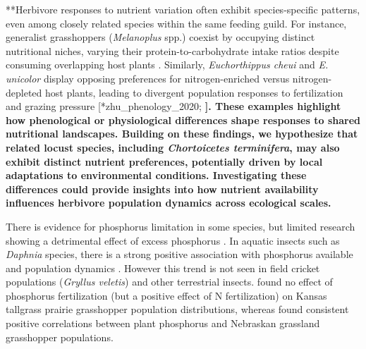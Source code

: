 \documentclass[
]{article}
\begin{document}
**Herbivore responses to nutrient variation often exhibit
species-specific patterns, even among closely related species within the
same feeding guild. For instance, generalist grasshoppers
(\emph{Melanoplus} spp.) coexist by occupying distinct nutritional
niches, varying their protein-to-carbohydrate intake ratios despite
consuming overlapping host plants \citep{behmer_coexisting_2008}.
Similarly, \emph{Euchorthippus cheui} and \emph{E. unicolor} display
opposing preferences for nitrogen-enriched versus nitrogen-depleted host
plants, leading to divergent population responses to fertilization and
grazing pressure {[}\citet{*}*zhu\_phenology\_2020;
\citet{zhu_constrasting_2023}\textbf{{]}. These examples highlight how
phenological or physiological differences shape responses to shared
nutritional landscapes. Building on these findings, we hypothesize that
related locust species, including \emph{Chortoicetes terminifera}, may
also exhibit distinct nutrient preferences, potentially driven by local
adaptations to environmental conditions. Investigating these differences
could provide insights into how nutrient availability influences
herbivore population dynamics across ecological scales.}

There is evidence for phosphorus limitation in some species, but limited
research showing a detrimental effect of excess phosphorus
\citep{cease_dietary_2016}. In aquatic insects such as \emph{Daphnia}
species, there is a strong positive association with phosphorus
available and population dynamics \citet{andersen_stoichiometry_2004}.
However this trend is not seen in field cricket populations
(\emph{Gryllus veletis}) \citep{harrison_synthesis_2014} and other
terrestrial insects. \citet{loaiza2011} found no effect of phosphorus
fertilization (but a positive effect of N fertilization) on Kansas
tallgrass prairie grasshopper population distributions, whereas
\citet{joern_not_2012} found consistent positive correlations between
plant phosphorus and Nebraskan grassland grasshopper populations.
\end{document}

